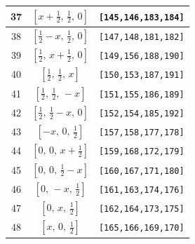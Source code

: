 \documentclass[fleqn,8pt]{jsarticle}
\begin{document}
\begin{longtable}{ccc}
37 & $\left[ x + \frac{1}{2},\, \frac{1}{2},\, 0 \right]$ & {\tt [145,146,183,184]} \\ \hline
38 & $\left[ \frac{1}{2} - x,\, \frac{1}{2},\, 0 \right]$ & {\tt [147,148,181,182]} \\ \hline
39 & $\left[ \frac{1}{2},\, x + \frac{1}{2},\, 0 \right]$ & {\tt [149,156,188,190]} \\ \hline
40 & $\left[ \frac{1}{2},\, \frac{1}{2},\, x \right]$ & {\tt [150,153,187,191]} \\ \hline
41 & $\left[ \frac{1}{2},\, \frac{1}{2},\, - x \right]$ & {\tt [151,155,186,189]} \\ \hline
42 & $\left[ \frac{1}{2},\, \frac{1}{2} - x,\, 0 \right]$ & {\tt [152,154,185,192]} \\ \hline
43 & $\left[ - x,\, 0,\, \frac{1}{2} \right]$ & {\tt [157,158,177,178]} \\ \hline
44 & $\left[ 0,\, 0,\, x + \frac{1}{2} \right]$ & {\tt [159,168,172,179]} \\ \hline
45 & $\left[ 0,\, 0,\, \frac{1}{2} - x \right]$ & {\tt [160,167,171,180]} \\ \hline
46 & $\left[ 0,\, - x,\, \frac{1}{2} \right]$ & {\tt [161,163,174,176]} \\ \hline
47 & $\left[ 0,\, x,\, \frac{1}{2} \right]$ & {\tt [162,164,173,175]} \\ \hline
48 & $\left[ x,\, 0,\, \frac{1}{2} \right]$ & {\tt [165,166,169,170]} \\
\end{longtable}
\renewcommand{\arraystretch}{1.2}
\end{document}
